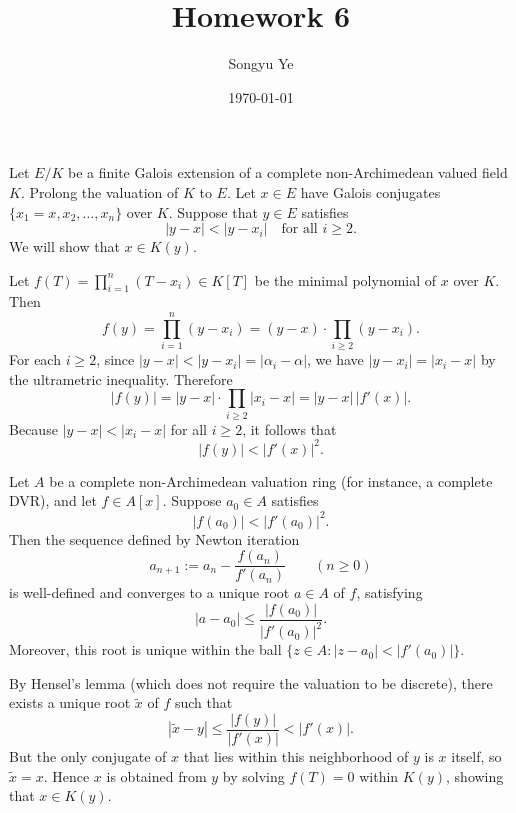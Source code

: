 \documentclass[12pt]{article}  %
\title{Homework 6}
\author{Songyu Ye}
\date{\today}
\begin{document}
\psettitle





\begin{solution}
Let $E/K$ be a finite Galois extension of a complete non-Archimedean valued field $K$.  Prolong the valuation of $K$ to $E$.  Let $x \in E$ have Galois conjugates $\{x_1=x, x_2, \dots, x_n\}$ over $K$.  Suppose that $y \in E$ satisfies
\[
|y - x| < |y - x_i| \quad \text{for all } i \ge 2.
\]
We will show that $x \in K(y)$.

Let $f(T) = \prod_{i=1}^n (T - x_i) \in K[T]$ be the minimal polynomial of $x$ over $K$.  Then
\[
f(y) = \prod_{i=1}^n (y - x_i)
      = (y - x) \cdot \prod_{i \ge 2} (y - x_i).
\]
For each $i \ge 2$, since $|y - x| < |y - x_i| = |\alpha_i - \alpha|$, we have $|y - x_i| = |x_i - x|$ by the ultrametric inequality.  Therefore
\[
|f(y)| = |y - x| \cdot \prod_{i \ge 2} |x_i - x|
        = |y - x| \, |f'(x)|.
\]
Because $|y - x| < |x_i - x|$ for all $i \ge 2$, it follows that
\[
|f(y)| < |f'(x)|^2.
\]

\begin{lemma}
Let $A$ be a complete non-Archimedean valuation ring (for instance, a complete DVR), and let $f \in A[x]$. 
Suppose $a_0 \in A$ satisfies
\[
|f(a_0)| < |f'(a_0)|^2.
\]
Then the sequence defined by Newton iteration
\[
a_{n+1} := a_n - \frac{f(a_n)}{f'(a_n)} \qquad (n \ge 0)
\]
is well-defined and converges to a unique root $a \in A$ of $f$, satisfying
\[
|a - a_0| \le \frac{|f(a_0)|}{|f'(a_0)|^2}.
\]
Moreover, this root is unique within the ball $\{z \in A : |z - a_0| < |f'(a_0)|\}$.
\end{lemma}


By Hensel's lemma (which does not require the valuation to be discrete), there exists a unique root $\tilde{x}$ of $f$ such that
\[
|\tilde{x} - y| \le \frac{|f(y)|}{|f'(x)|} < |f'(x)|.
\]
But the only conjugate of $x$ that lies within this neighborhood of $y$ is $x$ itself, so $\tilde{x} = x$.  Hence $x$ is obtained from $y$ by solving $f(T) = 0$ within $K(y)$, showing that $x \in K(y)$.
\end{solution}
\end{document}
